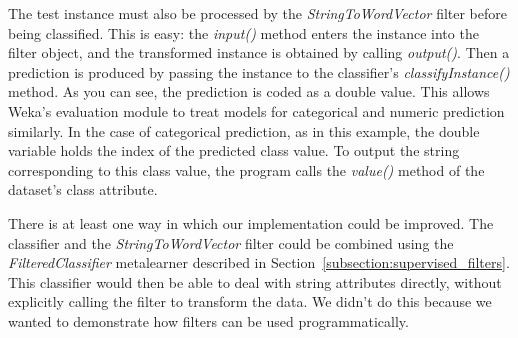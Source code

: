 The test instance must also be processed by the
\textit{StringToWordVector} filter before being classified. This is
easy: the \textit{input()} method enters the instance into the filter
object, and the transformed instance is obtained by calling
\textit{output()}. Then a prediction is produced by passing the
instance to the classifier's \textit{classifyInstance()} method. As
you can see, the prediction is coded as a double value. This allows
Weka's evaluation module to treat models for categorical and numeric
prediction similarly. In the case of categorical prediction, as in
this example, the double variable holds the index of the predicted
class value. To output the string corresponding to this class value,
the program calls the \textit{value()} method of the dataset's class
attribute.

There is at least one way in which our implementation could be
improved. The classifier and the \textit{StringToWordVector} filter
could be combined using the \textit{FilteredClassifier} metalearner
described in Section~\ref{subsection:supervised_filters}. This
classifier would then be able to deal with string attributes directly,
without explicitly calling the filter to transform the data. We didn't
do this because we wanted to demonstrate how filters can be used
programmatically.

